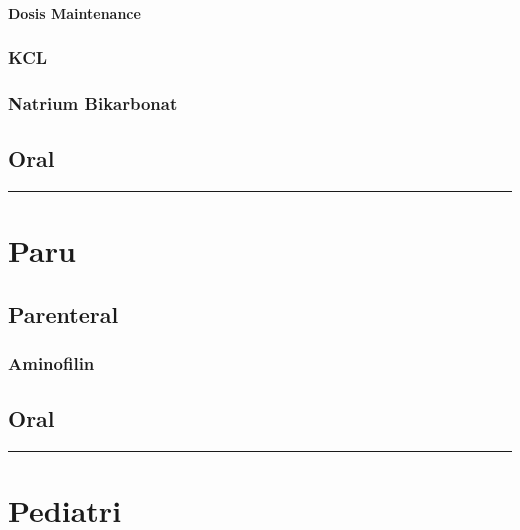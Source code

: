 \documentclass[
]{book}
\begin{document}
\hypertarget{dosis-maintenance}{%
\paragraph{Dosis Maintenance}\label{dosis-maintenance}}

\hypertarget{kcl}{%
\subsubsection{KCL}\label{kcl}}

\hypertarget{natrium-bikarbonat}{%
\subsubsection{Natrium Bikarbonat}\label{natrium-bikarbonat}}

\hypertarget{oral}{%
\subsection{Oral}\label{oral}}

\begin{center}\rule{0.5\linewidth}{0.5pt}\end{center}

\hypertarget{paru-1}{%
\section{Paru}\label{paru-1}}

\hypertarget{parenteral-1}{%
\subsection{Parenteral}\label{parenteral-1}}

\hypertarget{aminofilin}{%
\subsubsection{Aminofilin}\label{aminofilin}}

\hypertarget{oral-1}{%
\subsection{Oral}\label{oral-1}}

\begin{center}\rule{0.5\linewidth}{0.5pt}\end{center}

\hypertarget{pediatri-2}{%
\section{Pediatri}\label{pediatri-2}}
\end{document}
